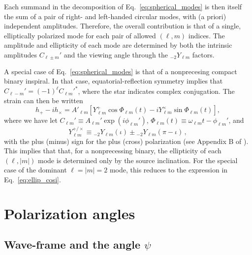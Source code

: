 \documentclass[aps,prd,twocolumn,superscriptaddress,preprintnumbers,floatfix,nofootinbib]{revtex4-2}
\begin{document}
Each summand in the decomposition of Eq.~\eqref{eq:spherical_modes} is then itself the sum of a pair of right- and left-handed circular modes, with (a priori) independent amplitudes.
Therefore, the overall contribution is that of a single, elliptically polarized mode for each pair of allowed $(\ell, m)$ indices.
The amplitude and ellipticity of each mode are determined by both the intrinsic amplitudes $C_{\ell \pm m}'$ and the viewing angle through the ${}_{-2} Y_{\ell m}$ factors.

A special case of Eq.~\eqref{eq:spherical_modes} is that of a nonprecesing compact binary inspiral.
In that case, equatorial-reflection symmetry implies that $C_{\ell -m}' = (-1)^\ell C_{\ell m}'^*$, where the star indicates complex conjugation.
The strain can then be written
\begin{equation}
h_+ - i h_\times = A'_{\ell m} \left[ Y^+_{\ell m} \cos \Phi_{\ell m}(t) - 
i Y^\times_{\ell m} \sin \Phi_{\ell m}(t) \right] , 
\end{equation}
where we have let $C_{\ell m}' \equiv A_{\ell m}' \exp(i \phi_{\ell m}')$, $\Phi_{\ell m}(t) \equiv \omega_{\ell m} t - \phi_{\ell m}'$, and
\begin{equation}
Y_{\ell m}^{+/\times} \equiv {}_{-2} Y_{\ell m}(\iota) \pm {}_{-2} Y_{\ell m}(\pi-\iota) \, ,
\end{equation}
with the plus (minus) sign for the plus (cross) polarization (see Appendix B of \cite{Isi:2021iql}).
This implies that that, for a nonprecessing binary, the ellipticity of each $(\ell, |m|)$ mode is determined only by the source inclination.
For the special case of the dominant $\ell=|m|=2$ mode, this reduces to the expression in Eq.~\eqref{eq:ellip_cosi}.


\section{Polarization angles}

\subsection{Wave-frame and the angle $\psi$}
\label{sec:pol}
\end{document}
